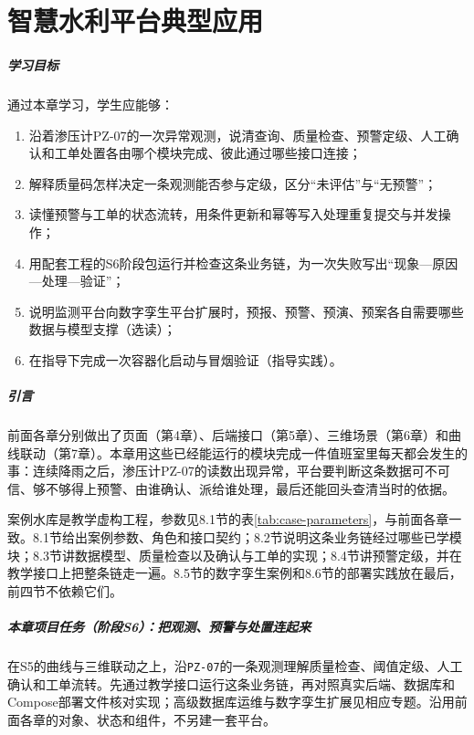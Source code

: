 \chapter{智慧水利平台典型应用}

\paragraph*{学习目标}

通过本章学习，学生应能够：

\begin{enumerate}
\item 沿着渗压计PZ-07的一次异常观测，说清查询、质量检查、预警定级、人工确认和工单处置各由哪个模块完成、彼此通过哪些接口连接；
\item 解释质量码怎样决定一条观测能否参与定级，区分“未评估”与“无预警”；
\item 读懂预警与工单的状态流转，用条件更新和幂等写入处理重复提交与并发操作；
\item 用配套工程的S6阶段包运行并检查这条业务链，为一次失败写出“现象—原因—处理—验证”；
\item 说明监测平台向数字孪生平台扩展时，预报、预警、预演、预案各自需要哪些数据与模型支撑（选读）；
\item 在指导下完成一次容器化启动与冒烟验证（指导实践）。
\end{enumerate}

\paragraph*{引言}

前面各章分别做出了页面（第4章）、后端接口（第5章）、三维场景（第6章）和曲线联动（第7章）。本章用这些已经能运行的模块完成一件值班室里每天都会发生的事：连续降雨之后，渗压计PZ-07的读数出现异常，平台要判断这条数据可不可信、够不够得上预警、由谁确认、派给谁处理，最后还能回头查清当时的依据。

案例水库是教学虚构工程，参数见8.1节的表\ref{tab:case-parameters}，与前面各章一致。8.1节给出案例参数、角色和接口契约；8.2节说明这条业务链经过哪些已学模块；8.3节讲数据模型、质量检查以及确认与工单的实现；8.4节讲预警定级，并在教学接口上把整条链走一遍。8.5节的数字孪生案例和8.6节的部署实践放在最后，前四节不依赖它们。


\begin{tipbox}
\paragraph{本章项目任务（阶段S6）：把观测、预警与处置连起来}在S5的曲线与三维联动之上，沿\texttt{PZ-07}的一条观测理解质量检查、阈值定级、人工确认和工单流转。先通过教学接口运行这条业务链，再对照真实后端、数据库和Compose部署文件核对实现；高级数据库运维与数字孪生扩展见相应专题。沿用前面各章的对象、状态和组件，不另建一套平台。

\end{tipbox}

